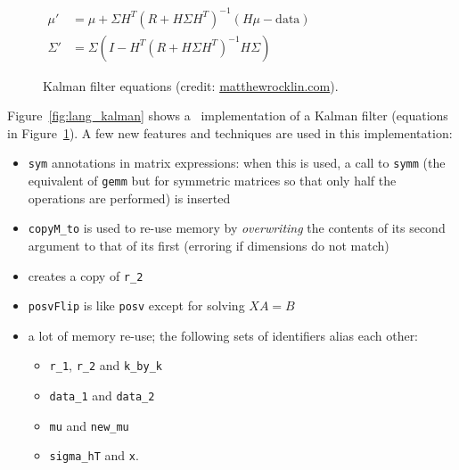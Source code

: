 \begin{figure}[t]
    {\centering
    $ \displaystyle
    \begin{aligned}
        \mu' &= \mu + \Sigma H^T (R + H \Sigma H^T)^{-1} (H \mu - \textrm{data})\\
        \Sigma' &= \Sigma ( I - H^T (R + H \Sigma H^T)^{-1} H \Sigma )
    \end{aligned}
    $ \par}
    \caption{Kalman filter equations (credit:
    \href{http://matthewrocklin.com/blog/work/2012/11/24/Kalman-Filter}{matthewrocklin.com}).}\label{fig:kalman_eqns}
\end{figure}

Figure~\ref{fig:lang_kalman} shows a \lang\ implementation of a Kalman filter
(equations in Figure~\ref{fig:kalman_eqns}). A few new features and techniques
are used in this implementation:
\begin{itemize}

    \item \texttt{sym} annotations in matrix expressions: when this is used, a
        call to \texttt{symm} (the equivalent of \texttt{gemm} but for
        symmetric matrices so that only half the operations are performed) is
        inserted

    \item \texttt{copyM\_to} is used to re-use memory by \emph{overwriting} the
        contents of its second argument to that of its first (erroring if
        dimensions do not match)

    \item {} creates a copy of \texttt{r\_2}

    \item \texttt{posvFlip} is like \texttt{posv} except for solving $XA = B$

    \item a lot of memory re-use; the following sets of identifiers alias each other:
        \begin{itemize}
            \item \texttt{r\_1}, \texttt{r\_2} and \texttt{k\_by\_k}
            \item \texttt{data\_1} and \texttt{data\_2}
            \item \texttt{mu} and \texttt{new\_mu}
            \item \texttt{sigma\_hT} and \texttt{x}.
        \end{itemize}

\end{itemize}

